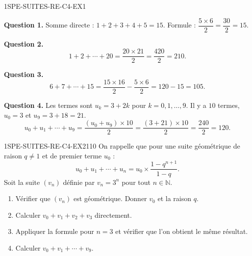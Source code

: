 \begin{corrige}{1SPE-SUITES-RE-C4-EX1}


\textbf{Question 1.} Somme directe : $1+2+3+4+5 = 15$.
Formule : $\dfrac{5 \times 6}{2} = \dfrac{30}{2} = 15$. \checkmark

\textbf{Question 2.}
\[
1 + 2 + \cdots + 20 = \frac{20 \times 21}{2} = \frac{420}{2} = 210.
\]


\textbf{Question 3.}
\[
6 + 7 + \cdots + 15 = \frac{15 \times 16}{2} - \frac{5 \times 6}{2} = 120 - 15 = 105.
\]


\textbf{Question 4.} Les termes sont $u_k = 3 + 2k$ pour $k = 0, 1, \ldots, 9$. Il y a $10$ termes, $u_0 = 3$ et $u_9 = 3 + 18 = 21$.
\[
u_0 + u_1 + \cdots + u_9 = \frac{(u_0 + u_9) \times 10}{2} = \frac{(3 + 21) \times 10}{2} = \frac{240}{2} = 120.
\]

\end{corrige}


\begin{exercice}{1SPE-SUITES-RE-C4-EX2}{1}{10}
On rappelle que pour une suite géométrique de raison $q \neq 1$ et de premier terme $u_0$ :
\[
u_0 + u_1 + \cdots + u_n = u_0 \times \frac{1 - q^{n+1}}{1 - q}.
\]
Soit la suite $(v_n)$ définie par $v_n = 3^n$ pour tout $n \in \mathbb{N}$.
\begin{enumerate}
  \item Vérifier que $(v_n)$ est géométrique. Donner $v_0$ et la raison $q$.
  \item Calculer $v_0 + v_1 + v_2 + v_3$ directement.
  \item Appliquer la formule pour $n = 3$ et vérifier que l'on obtient le même résultat.
  \item Calculer $v_0 + v_1 + \cdots + v_9$.
\end{enumerate}
\end{exercice}


